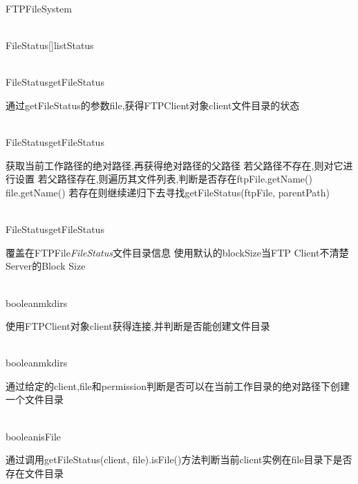 \begin{XeClass}{FTPFileSystem}
\begin{XeMethod}{\XePrivate\\ }{FileStatus[]}{listStatus}
  \end{XeMethod}

  \begin{XeMethod}{\XePublic\\ }{FileStatus}{getFileStatus}
       
 通过getFileStatus的参数file,获得FTPClient对象client文件目录的状态

  \end{XeMethod}

  \begin{XeMethod}{\XePrivate\\ }{FileStatus}{getFileStatus}
       
 获取当前工作路径的绝对路径,再获得绝对路径的父路径
 若父路径不存在,则对它进行设置
 若父路径存在,则遍历其文件列表,判断是否存在ftpFile.getName()  file.getName()
 若存在则继续递归下去寻找getFileStatus(ftpFile, parentPath)

  \end{XeMethod}

  \begin{XeMethod}{\XePrivate\\ }{FileStatus}{getFileStatus}
       
 覆盖在FTPFile\emph{FileStatus}文件目录信息
 使用默认的blockSize当FTP Client不清楚Server的Block Size

  \end{XeMethod}

  \begin{XeMethod}{\XePublic\\ }{boolean}{mkdirs}
       
 使用FTPClient对象client获得连接,并判断是否能创建文件目录

  \end{XeMethod}

  \begin{XeMethod}{\XePrivate\\ }{boolean}{mkdirs}
       
 通过给定的client,file和permission判断是否可以在当前工作目录的绝对路径下创建一个文件目录

  \end{XeMethod}

  \begin{XeMethod}{\XePrivate\\ }{boolean}{isFile}
       
 通过调用getFileStatus(client, file).isFile()方法判断当前client实例在file目录下是否存在文件目录

  \end{XeMethod}


\end{XeClass}
